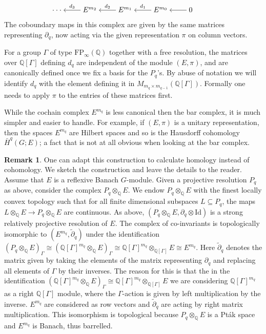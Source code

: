 \documentclass[12pt,reqno]{amsart}
\newcommand{\Q}{\mathbb{Q}}
\theoremstyle{definition}
\newtheorem{remark}[theorem]{Remark}
\begin{document}
\[\begin{tikzcd}[cramped]
	{\cdot\cdot\cdot} & {E^{m_2}} & {E^{m_1}} & {E^{m_0}} & 0 & {}
	\arrow["{d_3}"', from=1-2, to=1-1]
	\arrow["{d_2}"', from=1-3, to=1-2]
	\arrow["{d_1}"', from=1-4, to=1-3]
	\arrow[from=1-5, to=1-4]
\end{tikzcd}\]
The coboundary maps in this complex are given by the same matrices representing $\partial_q$, now acting via the given representation $\pi$ on column vectors.

For a group $\Gamma$ of type $\mathrm{FP}_\infty(\Q)$ together with a free resolution, the matrices over $\Q[\Gamma]$ defining $d_q$ are independent of the module $(E,\pi)$, and are canonically defined  once we fix a basis for the $P_q$'s. By abuse of notation we will identify $d_q$ with the element defining it in $M_{m_q\times m_{q-1}}(\Q[\Gamma])$. Formally one needs to apply $\pi$ to the entries of these matrices first.

While the cochain complex $E^{m_q}$ is less canonical then the bar complex, it is much simpler and easier to handle. For example, if $(E,\pi)$ is a unitary representation, then the spaces $E^{m_q}$ are Hilbert spaces and so is the Hausdorff cohomology $\bar{H}^q(G;E)$; a fact that is not at all obvious when looking at the bar complex.

\begin{remark}\label{rem:finiteness prop homology}
    One can adapt this construction to calculate homology instead of cohomology. We sketch the construction and leave the details to the reader. Assume that $E$ is a reflexive Banach $G$-module. Given a projective resolution $P_q$ as above, consider the complex $P_q \otimes_\Q E$. We endow $P_q \otimes_\Q E$ with the finest locally convex topology such that for all finite dimensional subspaces $L \subseteq P_q$, the maps $L\otimes_\Q E \to P_q \otimes_\Q E$ are continuous. As above, $(P_q\otimes_\Q E, \partial_q \otimes \mathrm{Id})$ is a strong relatively projective resolution of $E$. The complex of co-invariants is topologically isomorphic to $(E^{m_q},\tilde{\partial}_q)$ under the identification $(P_q\otimes_\Q E)_\Gamma \cong (\Q[\Gamma]^{m_q}\otimes_\Q E)_\Gamma \cong \Q[\Gamma]^{m_q}\otimes_{\Q[\Gamma]} E \cong E^{m_q}$. Here  $\tilde{\partial}_q$ denotes the matrix given by taking the elements of the matrix representing $\partial_q$ and replacing all elements of $\Gamma$ by their inverses. The reason for this is that the in the identification $(\Q[\Gamma]^{m_q}\otimes_\Q E)_\Gamma \cong \Q[\Gamma]^{m_q}\otimes_{\Q[\Gamma]} E$ we are considering $\Q[\Gamma]^{m_q}$ as a right $\Q[\Gamma]$ module, where the $\Gamma$-action is given by left   multiplication by the inverse. $E^{m_q}$ are considered as row vectors and $\tilde{\partial}_q$ are acting by right matrix multiplication. This isomorphism is topological because $P_q\otimes_\Q E$ is a Pt\'ak space and $E^{m_q}$ is Banach, thus barrelled. 
\end{remark}
\end{document}
